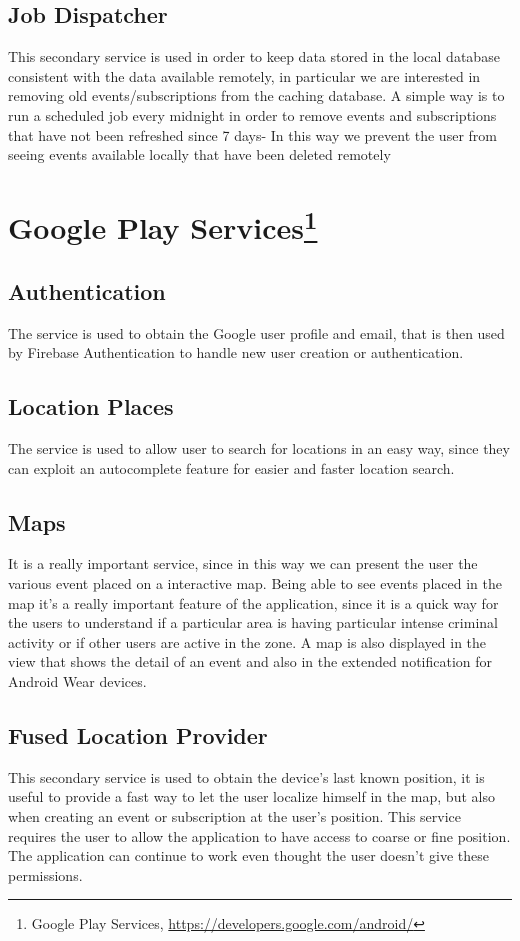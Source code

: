 \documentclass[a4paper]{scrreprt}
\begin{document}
\subsection{Job Dispatcher}
This secondary service is used in order to keep data stored in the local database consistent with the data available remotely, in particular we are interested in removing old events/subscriptions from the caching database. A simple way is to run a scheduled job every midnight in order to remove events and subscriptions that have not been refreshed since 7 days- In this way we prevent the user from seeing events available locally that have been deleted remotely

\section[Google Play Services]{Google Play Services\footnote{Google Play Services, \url{https://developers.google.com/android/}}}
\subsection{Authentication}
The service is used to obtain the Google user profile and email, that is then used by Firebase Authentication to handle new user creation or authentication.

\subsection{Location Places}
The service is used to allow user to search for locations in an easy way, since they can exploit an autocomplete feature for easier and faster location search.

\subsection{Maps}
It is a really important service, since in this way we can present the user the various event placed on a interactive map. Being able to see events placed in the map it's a really important feature of the application, since it is a quick way for the users to understand if a particular area is having particular intense criminal activity or if other users are active in the zone. A map is also displayed in the view that shows the detail of an event and also in the extended notification for Android Wear devices.

\subsection{Fused Location Provider}
This secondary service is used to obtain the device's last known position, it is useful to provide a fast way to let the user localize himself in the map, but also when creating an event or subscription at the user's position. This service requires the user to allow the application to have access to coarse or fine position. The application can continue to work even thought the user doesn't give these permissions.
\end{document}
